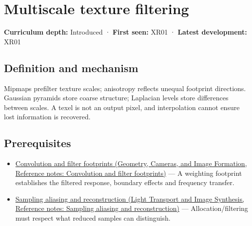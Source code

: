 \hypertarget{appendix-b677a85ba76f}{}\label{referencestart:appendix-b677a85ba76f}
\section{Multiscale texture filtering}\label{appendix-b677a85ba76f-multiscale-texture-filtering}

\hypertarget{appendix-b677a85ba76f-multiscale-texture-filtering}{}

\textbf{Curriculum depth:} Introduced · \textbf{First seen:} XR01 · \textbf{Latest development:} XR01

\begin{allmightroledefinition}

\subsection{Definition and mechanism}\label{appendix-b677a85ba76f-definition-and-mechanism}

\hypertarget{appendix-b677a85ba76f-definition-and-mechanism}{}

Mipmaps prefilter texture scales; anisotropy reflects unequal footprint directions. Gaussian pyramids store coarse structure; Laplacian levels store differences between scales. A texel is not an output pixel, and interpolation cannot ensure lost information is recovered.

\end{allmightroledefinition}

\subsection{Prerequisites}\label{appendix-b677a85ba76f-prerequisites}

\hypertarget{appendix-b677a85ba76f-prerequisites}{}

\begin{itemize}
\tightlist
\item
  \href{../03-Geometry-Cameras-and-Image-Formation/main.pdf\#nameddest=appendix-d5b3c692d9f0}{Convolution and filter footprints (Geometry, Cameras, and Image Formation, Reference notes: Convolution and filter footprints)} --- A weighting footprint establishes the filtered response, boundary effects and frequency transfer.
\item
  \href{../04-Light-Transport-and-Image-Synthesis/main.pdf\#nameddest=appendix-6a7869dd79a6}{Sampling aliasing and reconstruction (Light Transport and Image Synthesis, Reference notes: Sampling aliasing and reconstruction)} --- Allocation/filtering must respect what reduced samples can distinguish.
\end{itemize}

